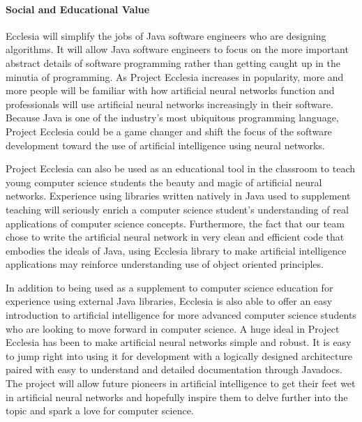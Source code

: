 \documentclass[letterpaper, 10pt]{article}
\begin{document}
	\paragraph{Social and Educational Value} 
	Ecclesia will simplify the jobs of Java software engineers who are designing algorithms. It will allow Java software engineers to focus on the more important abstract details of software programming rather than getting caught up in the minutia of programming. As Project Ecclesia increases in popularity, more and more people will be familiar with how artificial neural networks function and professionals will use artificial neural networks increasingly in their software. Because Java is one of the industry's most ubiquitous programming language, Project Ecclesia could be a game changer and shift the focus of the software development toward the use of artificial intelligence using neural networks.
	
	Project Ecclesia can also be used as an educational tool in the classroom to teach young computer science students the beauty and magic of artificial neural networks. Experience using libraries written natively in Java used to supplement teaching will seriously enrich a computer science student's understanding of real applications of computer science concepts. Furthermore, the fact that our team chose to write the artificial neural network in very clean and efficient code that embodies the ideals of Java, using Ecclesia library to make artificial intelligence applications may reinforce understanding use of object oriented principles.
	
	In addition to being used as a supplement to computer science education for experience using external Java libraries, Ecclesia is also able to offer an easy introduction to artificial intelligence for more advanced computer science students who are looking to move forward in computer science. A huge ideal in Project Ecclesia has been to make artificial neural networks simple and robust. It is easy to jump right into using it for development with a logically designed architecture paired with easy to understand and detailed documentation through Javadocs. The project will allow future pioneers in artificial intelligence to get their feet wet in artificial neural networks and hopefully inspire them to delve further into the topic and spark a love for computer science.
	
\end{document}
